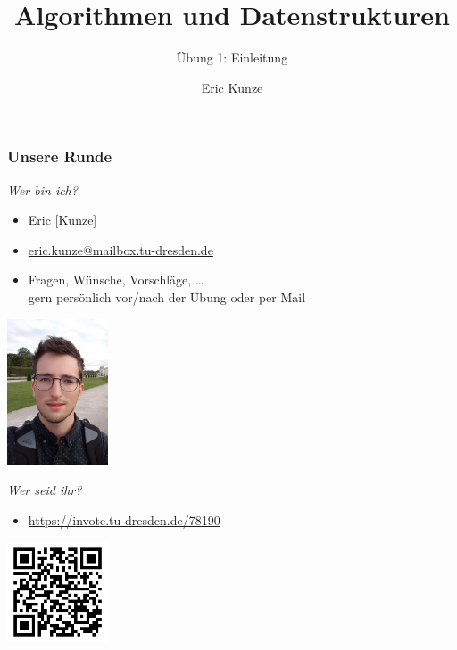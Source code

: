 \documentclass{beamer}
\begin{document}
	
	\title{Algorithmen und Datenstrukturen}
	\subtitle{Übung 1: Einleitung}
	\author{Eric Kunze}

	\maketitle
	
	\begin{frame} \frametitle{Unsere Runde}
		\begin{minipage}{\dimexpr0.75\linewidth-\fboxrule-\fboxsep}
			\emph{Wer bin ich?}
			\begin{itemize}
				\item Eric [Kunze]
				\item \url{eric.kunze@mailbox.tu-dresden.de}
				\item Fragen, Wünsche, Vorschläge, \dots \\ gern persönlich vor/nach der Übung oder per Mail
			\end{itemize}
		\end{minipage}
		\begin{minipage}{\dimexpr0.25\linewidth-\fboxrule-\fboxsep}
			\includegraphics[width=3cm]{./tut01_pic.jpg}
		\end{minipage}
	
		\pause
		
		\begin{minipage}{\dimexpr0.75\linewidth-\fboxrule-\fboxsep}
			\emph{Wer seid ihr?}
			\begin{itemize}
				\item \url{https://invote.tu-dresden.de/78190}
			\end{itemize}
		\end{minipage}
		\begin{minipage}{\dimexpr0.25\linewidth-\fboxrule-\fboxsep}
		\includegraphics[width=3cm]{./tut01_invote_1.png}
	\end{minipage}
		
	\end{frame}
\end{document}
